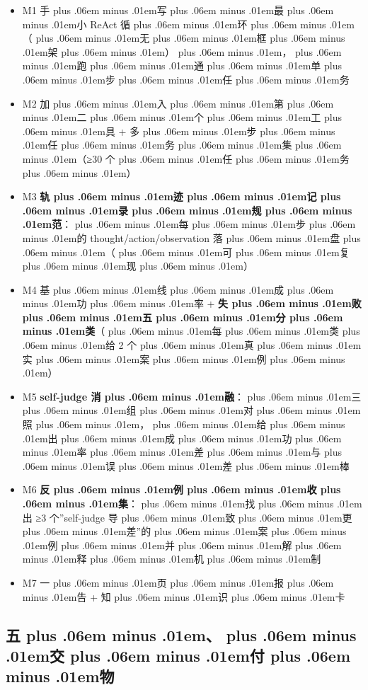 \documentclass[
]{article}
\providecommand{\tightlist}{%
  \setlength{\itemsep}{0pt}\setlength{\parskip}{0pt}}
\def\zh#1{{\zhfont #1}}
\def\sym#1{{\symfont #1}}
\def\zhglue{\hskip0pt plus .06em minus .01em}
\begin{document}
\begin{itemize}
\tightlist
\item[$\square$]
  M1 \zh{手\zhglue 写\zhglue 最\zhglue 小} ReAct \zh{循\zhglue 环\zhglue （\zhglue 无\zhglue 框\zhglue 架\zhglue ）\zhglue ，\zhglue 跑\zhglue 通\zhglue 单\zhglue 步\zhglue 任\zhglue 务}
\item[$\square$]
  M2 \zh{加\zhglue 入\zhglue 第\zhglue 二\zhglue 个\zhglue 工\zhglue 具} + \zh{多\zhglue 步\zhglue 任\zhglue 务\zhglue 集\zhglue （}\sym{≥}30 \zh{个\zhglue 任\zhglue 务\zhglue ）}
\item[$\square$]
  M3 \textbf{\zh{轨\zhglue 迹\zhglue 记\zhglue 录\zhglue 规\zhglue 范}}\zh{：\zhglue 每\zhglue 步\zhglue 的} thought/action/observation \zh{落\zhglue 盘\zhglue （\zhglue 可\zhglue 复\zhglue 现\zhglue ）}
\item[$\square$]
  M4 \zh{基\zhglue 线\zhglue 成\zhglue 功\zhglue 率} + \textbf{\zh{失\zhglue 败\zhglue 五\zhglue 分\zhglue 类}}\zh{（\zhglue 每\zhglue 类\zhglue 给} 2 \zh{个\zhglue 真\zhglue 实\zhglue 案\zhglue 例\zhglue ）}
\item[$\square$]
  M5 \textbf{self-judge \zh{消\zhglue 融}}\zh{：\zhglue 三\zhglue 组\zhglue 对\zhglue 照\zhglue ，\zhglue 给\zhglue 出\zhglue 成\zhglue 功\zhglue 率\zhglue 差\zhglue 与\zhglue 误\zhglue 差\zhglue 棒}
\item[$\square$]
  M6 \textbf{\zh{反\zhglue 例\zhglue 收\zhglue 集}}\zh{：\zhglue 找\zhglue 出} \sym{≥}3 \zh{个}''self-judge \zh{导\zhglue 致\zhglue 更\zhglue 差}''\zh{的\zhglue 案\zhglue 例\zhglue 并\zhglue 解\zhglue 释\zhglue 机\zhglue 制}
\item[$\square$]
  M7 \zh{一\zhglue 页\zhglue 报\zhglue 告} + \zh{知\zhglue 识\zhglue 卡}
\end{itemize}

\subsection{\zh{五\zhglue 、\zhglue 交\zhglue 付\zhglue 物}}\label{ux4e94ux4ea4ux4ed8ux7269}
\end{document}
